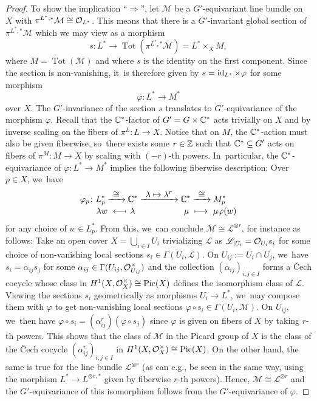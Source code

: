 \documentclass[11pt]{article}
\newcommand{\eg}{e.g.,\xspace}
\newcommand\mto{\mathchoice{\longmapsto}{\mapsto}{\mapsto}{\mapsto}}
\newcommand{\To}[1]{\mathchoice{\xrightarrow{\textstyle\kern4pt#1\kern3pt}}{\xrightarrow{\,#1\,}}{}{}}
\newcommand\from{\mathchoice{\longleftarrow}{\leftarrow}{\leftarrow}{\leftarrow}}
\newcommand\mfrom{\mathrel{\from\joinrel\mapstochar}}
\newcommand{\Ell}{\mathscr{L}}
\DeclareMathOperator{\id}{\textup{id}}
\DeclareMathOperator{\Pic}{Pic}
\DeclareMathOperator{\Tot}{Tot}
\newcommand\restr[2]{{#1_{| {#2}}}}
\begin{document}
\begin{proof}
To show the implication ``$\Rightarrow$'', let $\mathcal M$ be a $G'$-equivariant line bundle on $X$ with $\pi^{L^*,*} \mathcal M \cong \mathcal{O}_{L^*}$. This means that there is a $G'$-invariant global section of $\pi^{L^*,*} \mathcal M$ which we may view as a morphism
\[
s \colon L^* \to \Tot(\pi^{L^*,*} \mathcal M) = L^* \times_X M,
\]
where $M = \Tot(\mathcal M)$ and where $s$ is the identity on the first component. Since the section is non-vanishing, it~is therefore given by $s = \id_{L^*} \times \varphi$ for some morphism
\[
\varphi \colon L^* \to M^*
\]
over $X$. The $G'$-invariance of the section $s$ translates to $G'$-equivariance of the morphism $\varphi$. Recall that the ${\mathbb C}^*$-factor of $G'=G \times {\mathbb C}^*$ acts trivially on $X$ and by inverse scaling on the fibers of $\pi^{L} \colon L \to X$. Notice that on $M$, the ${\mathbb C}^*$-action must also be given fiberwise, so~there exists some $r \in {\mathbb Z}$ such that ${\mathbb C}^* \subseteq G'$ acts on fibers of $\pi^{M}\colon M \to X$ by scaling with $(-r)$-th powers. In~particular, the ${\mathbb C}^*$-equivariance of $\varphi \colon L^* \to M^*$ implies the following fiberwise description: Over $p \in X$, we~have
\begin{align*}
\varphi_p \colon L_p^* \To{\cong} \C^* &\To{\lambda \mto \lambda^r} \C^* \To{\cong} M_p^* \\[
-0.25em]
\lambda w \ \mfrom \ \lambda \ &\hphantom{\To{\lambda \mto \lambda^r}{}} \ \ \mu \ \mto \ \mu \varphi(w)
\end{align*}
for any choice of $w \in L_p^*$.
From this, we~can conclude $\mathcal M \cong \Ell^{\otimes r}$, for instance as follows: Take an open cover $X = \bigcup_{i \in I} U_i$ trivializing $\Ell$ as $\restr{\Ell}{U_i} = \O_{U_i} s_i$ for some choice of non-vanishing local sections $s_i \in \Gamma(U_i,\Ell)$. On $U_{ij} := U_i \cap U_j$, we~have $s_i = \alpha_{ij} s_j$ for some $\alpha_{ij} \in \Gamma(U_{ij}, \mathcal{O}_{U_{ij}}^\times)$ and the collection $(\alpha_{ij})_{i,j \in I}$ forms a {\v{C}}ech cocycle whose class in $H^1(X,\O_X^\times) \cong \Pic(X)$ defines the isomorphism class of $\Ell$. Viewing the sections $s_i$ geometrically as morphisms $U_i \to L^*$, we~may compose them with $\varphi$ to get non-vanishing local sections $\varphi \circ s_i \in \Gamma(U_i, \mathcal M)$. On $U_{ij}$, we~then have $\varphi \circ s_i = (\alpha_{ij}^r) (\varphi \circ s_j)$ since $\varphi$ is given on fibers of $X$ by taking $r$-th powers. This shows that the class of $\mathcal M$ in the Picard group of $X$ is the class of the {\v{C}}ech cocycle $(\alpha_{ij}^r)_{i,j \in I}$ in $H^1(X,\O_X^\times) \cong \Pic(X)$. On the other hand, the same is true for the line bundle $\Ell^{\otimes r}$ (as can \eg be seen in the same way, using the morphism $L^* \to L^{\otimes r,*}$ given by fiberwise $r$-th powers). Hence, $\mathcal M \cong \Ell^{\otimes r}$ and the $G'$-equivariance of this isomorphism follows from the $G'$-equivariance of $\varphi$.
\end{proof}
\end{document}
